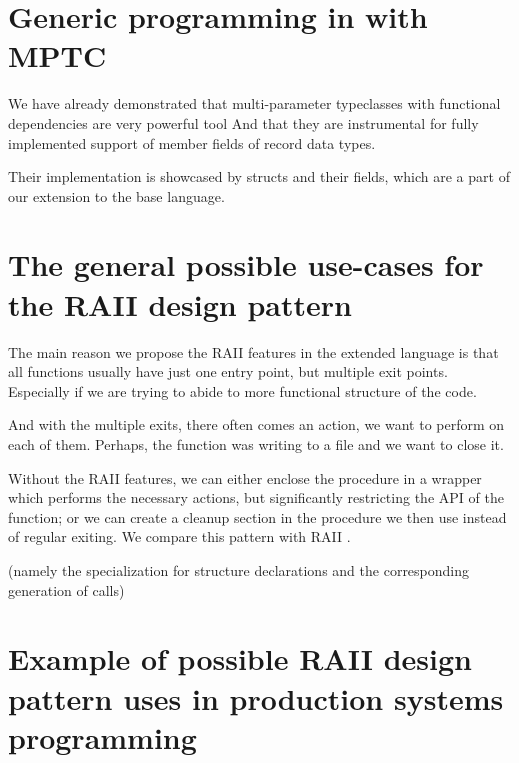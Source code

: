 

\section{Generic programming in \cmm with MPTC}

We have already demonstrated  that multi-parameter typeclasses with functional dependencies are very powerful tool And that they are instrumental for fully implemented support of member fields of record data types.

Their implementation is showcased by structs and their fields, which are a part of our extension to the base \cmm language.

\section{The general possible use-cases for the RAII design pattern}

The main reason we propose the RAII features in the extended \cmm language is that all functions usually have just one entry point, but multiple exit points. Especially if we are trying to abide to more functional structure of the code.

And with the multiple exits, there often comes an action, we want to perform on each of them. Perhaps, the function was writing to a file and we want to close it.

Without the RAII features, we can either enclose the procedure in a wrapper which performs the necessary actions, but significantly restricting the API of the function; or we can create a cleanup section in the procedure we then use instead of regular exiting. We compare this pattern with RAII .


 (namely the  specialization for structure declarations and the corresponding generation of  calls)

\section{Example of possible RAII design pattern uses in production systems programming}

